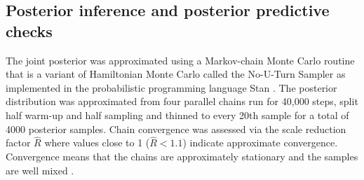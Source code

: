 \documentclass[11pt]{article}
\begin{document}
\subsection*{Posterior inference and posterior predictive checks}
The joint posterior was approximated using a Markov-chain Monte Carlo routine that is a variant of Hamiltonian Monte Carlo called the No-U-Turn Sampler \citep{Hoffman2014} as implemented in the probabilistic programming language Stan \citep{2014stan}. The posterior distribution was approximated from four parallel chains run for 40,000 steps, split half warm-up and half sampling and thinned to every 20th sample for a total of 4000 posterior samples. Chain convergence was assessed via the scale reduction factor \(\hat{R}\) where values close to 1 (\(\hat{R} < 1.1\)) indicate approximate convergence. Convergence means that the chains are approximately stationary and the samples are well mixed \citep{Gelman2013d}.

%
%
%
\end{document}
